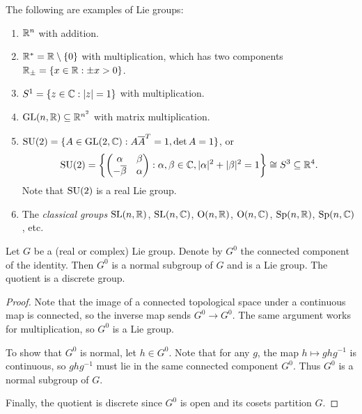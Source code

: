 \begin{example}
  The following are examples of
  Lie groups:
  \begin{enumerate}
    \item $\mathbb{R}^n$ with addition.
    \item $\mathbb{R}^* = \mathbb{R} \setminus \{0\}$ with
      multiplication, which has two
      components $\mathbb{R}_{\pm} = \{x \in \mathbb{R} : \pm x > 0\}$.
    \item $S^1 = \{z \in \mathbb{C} : |z| = 1\}$ with
      multiplication.
    \item $\operatorname{GL}(n, \mathbb{R}) \subseteq \mathbb{R}^{n^2}$
      with matrix multiplication.
    \item $\operatorname{SU}(2) = \{A \in \operatorname{GL}(2, \mathbb{C}) : A \overline{A}^T = 1, \det A = 1\}$, or
      \[
        \operatorname{SU}(2) = \left\{
          \begin{pmatrix}
            \alpha & \beta \\
            -\overline{\beta} & \alpha
          \end{pmatrix}
          : \alpha, \beta \in \mathbb{C}, |\alpha|^2 + |\beta|^2 = 1
        \right\} \cong S^3 \subseteq \mathbb{R}^4.
      \]
      Note that $\operatorname{SU}(2)$ is a real
      Lie group.
    \item The \emph{classical groups}
      $\operatorname{SL}(n, \mathbb{R})$, $\operatorname{SL}(n, \mathbb{C})$, $\operatorname{O}(n, \mathbb{R})$,
      $\operatorname{O}(n, \mathbb{C})$, $\operatorname{Sp}(n, \mathbb{R})$, $\operatorname{Sp}(n, \mathbb{C})$, etc.
  \end{enumerate}
\end{example}

\begin{theorem}
  Let $G$ be a (real or complex) Lie group.
  Denote by $G^0$ the connected component
  of the identity. Then $G^0$ is a normal
  subgroup of $G$ and is a Lie group.
  The quotient is a discrete group.
\end{theorem}

\begin{proof}
  Note that the image of a connected
  topological space under a continuous
  map is connected, so the
  inverse map sends $G^0 \to G^0$. The
  same argument works for multiplication,
  so $G^0$ is a Lie group.

  To show that $G^0$ is normal, let
  $h \in G^0$. Note that for any $g$,
  the map $h \mapsto g h g^{-1}$ is
  continuous, so $g h g^{-1}$ must lie
  in the same connected component
  $G^0$. Thus
  $G^0$ is a normal subgroup of $G$.

  Finally, the quotient is discrete since
  $G^0$ is open and its cosets
  partition $G$.
\end{proof}

